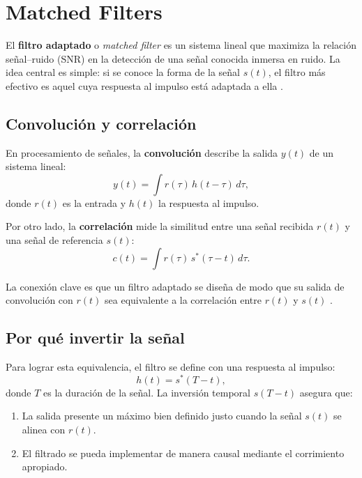 \section{Matched Filters}\label{sec:matched}

El \textbf{filtro adaptado} o \emph{matched filter} es un sistema lineal que 
maximiza la relación señal--ruido (SNR) en la detección de una señal conocida inmersa en ruido.  
La idea central es simple: si se conoce la forma de la señal $s(t)$, 
el filtro más efectivo es aquel cuya respuesta al impulso está adaptada a ella 
\cite{Bancroft2002,Haykin2001,Proakis2007}.

\subsection{Convolución y correlación}

En procesamiento de señales, la \textbf{convolución} describe la salida $y(t)$ de un sistema lineal:
\begin{equation}
	y(t) = \int r(\tau)\, h(t-\tau)\, d\tau,
\end{equation}
donde $r(t)$ es la entrada y $h(t)$ la respuesta al impulso.  

Por otro lado, la \textbf{correlación} mide la similitud entre una señal recibida $r(t)$ 
y una señal de referencia $s(t)$:
\begin{equation}
	c(t) = \int r(\tau)\, s^*(\tau-t)\, d\tau.
\end{equation}

La conexión clave es que un filtro adaptado se diseña de modo que 
su salida de convolución con $r(t)$ sea equivalente a la correlación entre $r(t)$ y $s(t)$
\cite{Bancroft2002}.

\subsection{Por qué invertir la señal}

Para lograr esta equivalencia, el filtro se define con una respuesta al impulso:
\begin{equation}
	h(t) = s^*(T-t),
\end{equation}
donde $T$ es la duración de la señal.  
La inversión temporal $s(T-t)$ asegura que:
\begin{enumerate}
	\item La salida presente un máximo bien definido justo cuando la señal $s(t)$ se alinea con $r(t)$.  
	\item El filtrado se pueda implementar de manera causal mediante el corrimiento apropiado.  
\end{enumerate}

